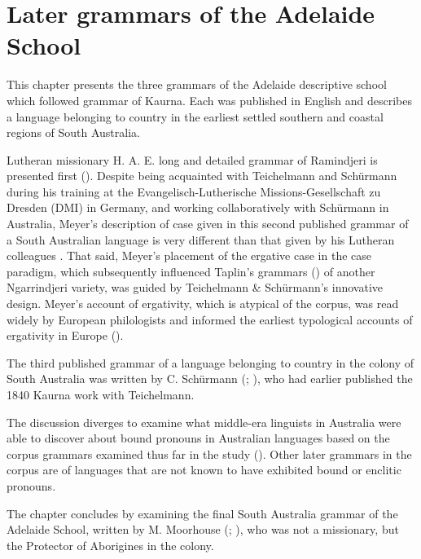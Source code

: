 \chapter{Later grammars of the Adelaide School}
\label{chap:key:6}

This chapter presents the three grammars of the Adelaide descriptive school which followed  grammar of Kaurna. Each was published in English and describes a language belonging to country in the earliest settled southern and coastal regions of South Australia.

Lutheran missionary H. A. E.  long and detailed grammar of Ramindjeri is presented first (). Despite being acquainted with Teichelmann and Schürmann during his training at the Evangelisch-Lutherische Missions-Gesellschaft zu Dresden (DMI) in Germany, and working collaboratively with Schürmann in Australia, Meyer’s description of case given in this second published grammar of a South Australian language is very different than that given by his Lutheran colleagues \citet{TeichelmannSchürmann1840}. That said, Meyer’s placement of the ergative case in the case paradigm, which subsequently influenced Taplin’s grammars () of another Ngarrindjeri variety, was guided by Teichelmann \& Schürmann’s innovative design. Meyer’s account of ergativity, which is atypical of the corpus, was read widely by European philologists and informed the earliest typological accounts of ergativity in Europe ().

The third published grammar of a language belonging to country in the colony of South Australia was written by C. Schürmann (\citeyear{Schürmann1844}; ), who had earlier published the 1840 Kaurna work with Teichelmann.

The discussion diverges to examine what middle-era linguists in Australia were able to discover about bound pronouns in Australian languages based on the corpus grammars examined thus far in the study (). Other later grammars in the corpus are of languages that are not known to have exhibited bound or enclitic pronouns.

The chapter concludes by examining the final South Australia grammar of the Adelaide School, written by M. Moorhouse (\citeyear{moorhouse_vocabulary_1846}; ), who was not a missionary, but the Protector of Aborigines in the colony.

